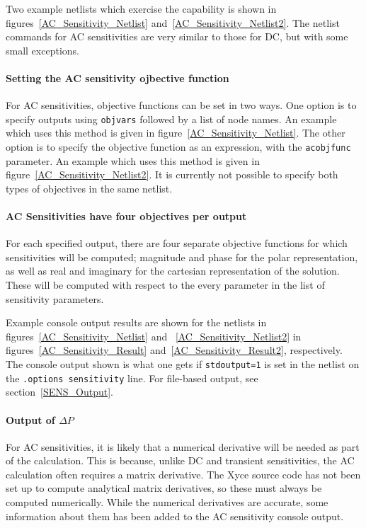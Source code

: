 Two example netlists which exercise the
capability is shown in figures~\ref{AC_Sensitivity_Netlist} 
and~\ref{AC_Sensitivity_Netlist2}.
The netlist commands for AC sensitivities are very similar to those
for DC, but with some small exceptions.   

\paragraph{Setting the AC sensitivity ojbective function}
For AC sensitivities, objective functions can be set in two ways.  One option is to 
specify outputs using \texttt{objvars} followed by a list of node names.      
An example which  uses this method is given in figure~\ref{AC_Sensitivity_Netlist}.  
The other option is to specify the objective function as an expression, with 
the \texttt{acobjfunc} parameter.  
An example which  uses this method is given in figure~\ref{AC_Sensitivity_Netlist2}.  
It is currently not  possible to specify both types of objectives in the same netlist.

\paragraph{AC Sensitivities have four objectives per output}
For each specified output, there are four separate objective functions
for which sensitivities will be computed; magnitude and phase for the
polar representation, as well as real and imaginary for the cartesian
representation of the solution.   These will be computed with respect to 
the every parameter in the list of sensitivity parameters.   

Example console output results are shown for the netlists in figures~\ref{AC_Sensitivity_Netlist} 
and ~\ref{AC_Sensitivity_Netlist2} in figures~\ref{AC_Sensitivity_Result} 
and~\ref{AC_Sensitivity_Result2}, respectively.  The console output shown is what one gets 
if \texttt{stdoutput=1} is set in the netlist on the \texttt{.options sensitivity} line.
For file-based output, see section~\ref{SENS_Output}.  

\paragraph{Output of $\Delta P$}
For AC sensitivities, it is likely that a numerical derivative will be needed
as part of the calculation.  This is because, unlike DC and transient 
sensitivities, the AC calculation often requires a matrix derivative.  
The Xyce source code has not been set up to compute analytical matrix 
derivatives, so these must always be computed numerically.
While the numerical derivatives are accurate, some information about 
them has been added to the AC sensitivity console output.

